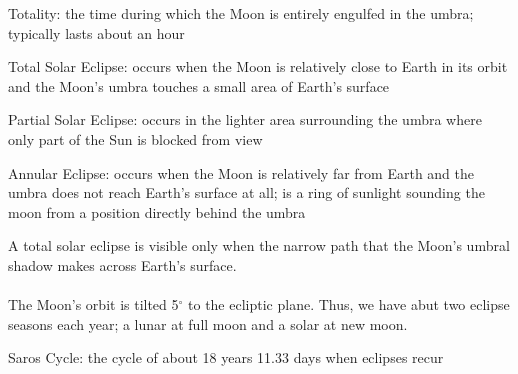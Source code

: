 \documentclass[12pt]{article}
\begin{document}
\begin{definition} Totality: the time during which the Moon is entirely engulfed in the umbra; typically lasts about an hour \end{definition} 
\begin{definition} Total Solar Eclipse: occurs when the Moon is relatively close to Earth in its orbit and the Moon's umbra touches a small area of Earth's surface \end{definition}
\begin{definition} Partial Solar Eclipse: occurs in the lighter area surrounding the umbra where only part of the Sun is blocked from view \end{definition} 
\begin{definition} Annular Eclipse: occurs when the Moon is relatively far from Earth and the umbra does not reach Earth's surface at all; is a ring of sunlight sounding the moon from a position directly behind the umbra \end{definition} 
A total solar eclipse is visible only when the narrow path that the Moon's umbral shadow makes across Earth's surface. \\~\\
The Moon's orbit is tilted 5$^\circ$ to the ecliptic plane. Thus, we have abut two eclipse seasons each year; a lunar at full moon and a solar at new moon. 
\begin{definition} Saros Cycle: the cycle of about 18 years 11.33 days when eclipses recur \end{definition} 
\end{document}
